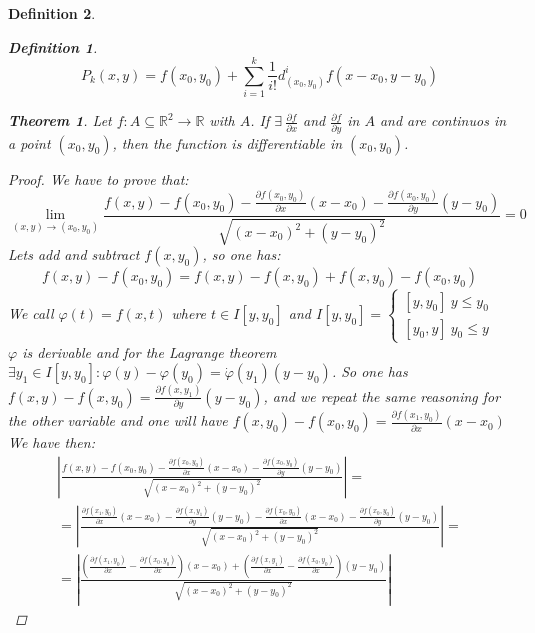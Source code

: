 \documentclass{article}
\newtheorem{theorem}{Theorem}
\newtheorem{definition}{Definition}
\begin{document}
\begin{definition}
\begin{definition}
            \begin{equation*}
                P_k(x,y) = f(x_0,y_0) + \sum_{i = 1}^{k} \frac{1}{i!}d_{(x_0,y_0)}^if(x-x_0,y-y_0)  
            \end{equation*}  
        \end{definition}
        \begin{theorem}
            Let $f : A \subseteq \mathbb{R}^2 \rightarrow \mathbb{R}$ with $A$. If $\exists \ \frac{\partial f}{\partial x}$ and $\frac{\partial f}{\partial y}$ in $A$ and are continuos in a point $(x_0,y_0)$, then the function is differentiable in $(x_0,y_0)$.
            \begin{proof}
                We have to prove that:
                \begin{equation*}
                    \lim_{(x,y) \to (x_0,y_0)}\frac{f(x,y) - f(x_0,y_0) - \frac{\partial f(x_0,y_0)}{\partial x}(x-x_0) - \frac{\partial f(x_0,y_0)}{\partial y}(y-y_0)}{\sqrt{(x-x_0)^2 + (y-y_0)^2}} = 0
                \end{equation*}
                Lets add and subtract $f(x,y_0)$, so one has:
                \begin{equation*}
                    f(x,y) - f(x_0,y_0) = f(x,y) - f(x,y_0) + f(x,y_0) - f(x_0,y_0)
                \end{equation*} 
                We call $\varphi (t) = f(x,t)$ where $t \in I[y,y_0]$ and $I[y,y_0] = \begin{cases}
                    [y,y_0] \ y \leq y_0 \\
                    [y_0,y] \ y_0 \leq y
                \end{cases}$ \\
                $\varphi$ is derivable and for the Lagrange theorem $\exists y_1 \in I[y,y_0] : \varphi (y) - \varphi (y_0) = \dot{\varphi}(y_1)(y-y_0)$. So one has $f(x,y) - f(x,y_0) = \frac{\partial f(x,y_1)}{\partial y}(y-y_0)$, and we repeat the same reasoning for the other variable and one will have $f(x,y_0) - f(x_0,y_0) = \frac{\partial f(x_1,y_0)}{\partial x}(x-x_0)$
                We have then: 
                    \begin{gather*}
                        \left\lvert \frac{f(x,y) - f(x_0,y_0) - \frac{\partial f(x_0,y_0)}{\partial x}(x-x_0) - \frac{\partial f(x_0,y_0)}{\partial y}(y-y_0)}{\sqrt{(x-x_0)^2 + (y-y_0)^2}} \right\rvert = \\ = \left\lvert \frac{\frac{\partial f(x_1,y_0)}{\partial x}(x-x_0) - \frac{\partial f(x,y_1)}{\partial y}{(y-y_0) - \frac{\partial f(x_0,y_0)}{\partial x}(x-x_0) - \frac{\partial f(x_0,y_0)}{\partial y}(y-y_0)}}{\sqrt{(x-x_0)^2 + (y-y_0)^2}} \right\rvert = \\ = \left\lvert \frac{\left(\frac{\partial f (x_1,y_0)}{\partial x} - \frac{\partial f (x_0,y_0)}{\partial x} \right)(x-x_0) + \left( \frac{\partial f (x,y_1)}{\partial x} - \frac{\partial f(x_0,y_0)}{\partial x}\right)(y-y_0)}{\sqrt{(x-x_0)^2 + (y-y_0)^2}}\right\rvert  

\end{gather*}
\end{proof}
\end{theorem}
\end{definition}
\end{document}
